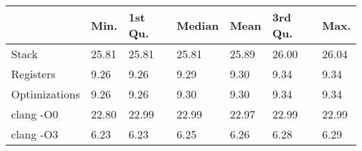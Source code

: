 \begin{table}[ht]
\centering
\begin{tabular}{p{}p{}p{}p{}p{}p{}p{}}
  \hline
 & Min. & 1st Qu. & Median & Mean & 3rd Qu. & Max. \\ 
  \hline
Stack & 25.81 & 25.81 & 25.81 & 25.89 & 26.00 & 26.04 \\ 
  Registers & 9.26 & 9.26 & 9.29 & 9.30 & 9.34 & 9.34 \\ 
  Optimizations & 9.26 & 9.26 & 9.30 & 9.30 & 9.34 & 9.34 \\ 
  clang -O0 & 22.80 & 22.99 & 22.99 & 22.97 & 22.99 & 22.99 \\ 
  clang -O3 & 6.23 & 6.23 & 6.25 & 6.26 & 6.28 & 6.29 \\ 
   \hline
\end{tabular}
\end{table}
